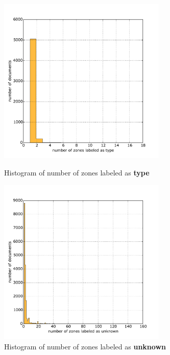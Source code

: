   \begin{figure}
\centering
\begin{minipage}[t!]{0.48\linewidth}
  \includegraphics[width=8cm]{plots/type_histogram}
  \caption{Histogram of number of zones labeled as \textbf{type}}
  \label{fig:type_histogram}
\end{minipage}
\quad
\begin{minipage}[t!]{0.48\linewidth}
  \includegraphics[width=8cm]{plots/unknown_histogram}
  \caption{Histogram of number of zones labeled as \textbf{unknown}}
  \label{fig:unknown_histogram}
\end{minipage}
\end{figure}


